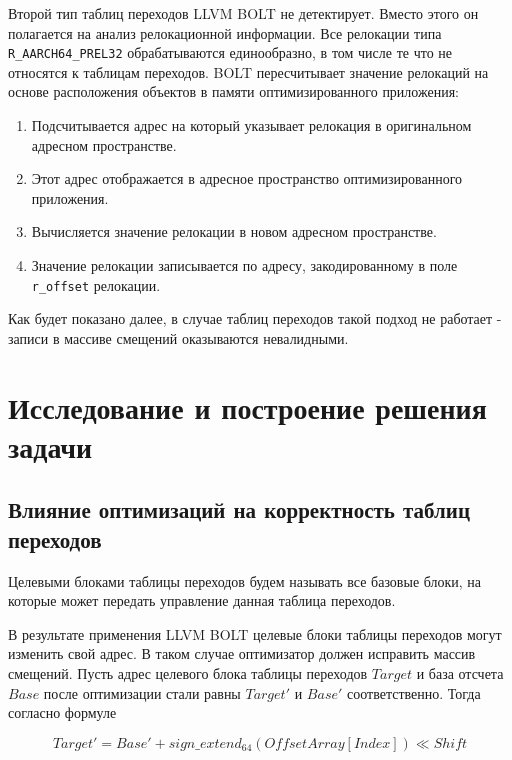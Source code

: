 \documentclass{mipt-thesis-bs}
\begin{document}
    Второй тип таблиц переходов LLVM BOLT не детектирует. Вместо этого он полагается на анализ релокационной информации. Все релокации типа \verb|R_AARCH64_PREL32| обрабатываются единообразно, в том числе те что не относятся к таблицам переходов. BOLT пересчитывает значение релокаций на основе расположения объектов в памяти оптимизированного приложения:
    \begin{enumerate}
        \item Подсчитывается адрес на который указывает релокация в оригинальном адресном пространстве.
        \item Этот адрес отображается в адресное пространство оптимизированного приложения.
        \item Вычисляется значение релокации в новом адресном пространстве.
        \item Значение релокации записывается по адресу, закодированному в поле \verb|r_offset| релокации.
    \end{enumerate}
    Как будет показано далее, в случае таблиц переходов такой подход не работает - записи в массиве смещений оказываются невалидными.

    \chapter{Исследование и построение решения задачи}

    \section{Влияние оптимизаций на корректность таблиц переходов}

    Целевыми блоками таблицы переходов будем называть все базовые блоки, на которые может передать управление данная таблица переходов.

    В результате применения LLVM BOLT целевые блоки таблицы переходов могут изменить свой адрес. В таком случае оптимизатор должен исправить массив смещений. Пусть адрес целевого блока таблицы переходов $Target$ и база отсчета $Base$ после оптимизации стали равны $Target'$ и $Base'$ соответственно. Тогда согласно формуле 

    \begin{equation}
        Target' = Base' + sign\_extend_{64}(OffsetArray[Index]) \ll Shift
        \label{eq:target'}
    \end{equation}
\end{document}
